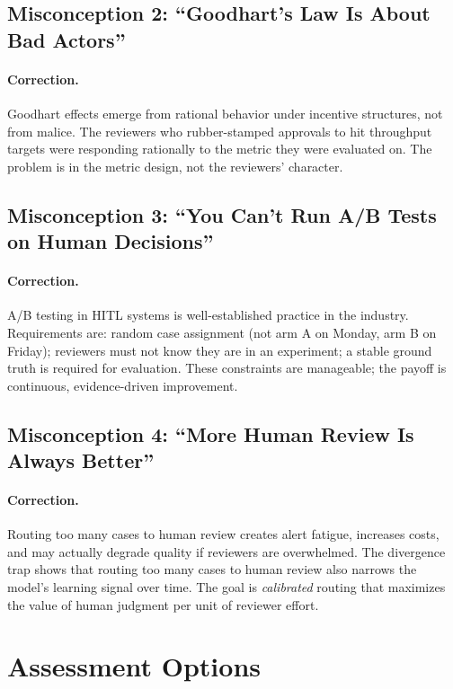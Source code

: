 \subsection{Misconception 2: ``Goodhart's Law Is About Bad Actors''}

\paragraph{Correction.}
Goodhart effects emerge from rational behavior under incentive structures, not from malice. The reviewers who rubber-stamped approvals to hit throughput targets were responding rationally to the metric they were evaluated on. The problem is in the metric design, not the reviewers' character.

\subsection{Misconception 3: ``You Can't Run A/B Tests on Human Decisions''}

\paragraph{Correction.}
A/B testing in HITL systems is well-established practice in the industry. Requirements are: random case assignment (not arm A on Monday, arm B on Friday); reviewers must not know they are in an experiment; a stable ground truth is required for evaluation. These constraints are manageable; the payoff is continuous, evidence-driven improvement.

\subsection{Misconception 4: ``More Human Review Is Always Better''}

\paragraph{Correction.}
Routing too many cases to human review creates alert fatigue, increases costs, and may actually degrade quality if reviewers are overwhelmed. The divergence trap shows that routing too many cases to human review also narrows the model's learning signal over time. The goal is \emph{calibrated} routing that maximizes the value of human judgment per unit of reviewer effort.

\section{Assessment Options}

